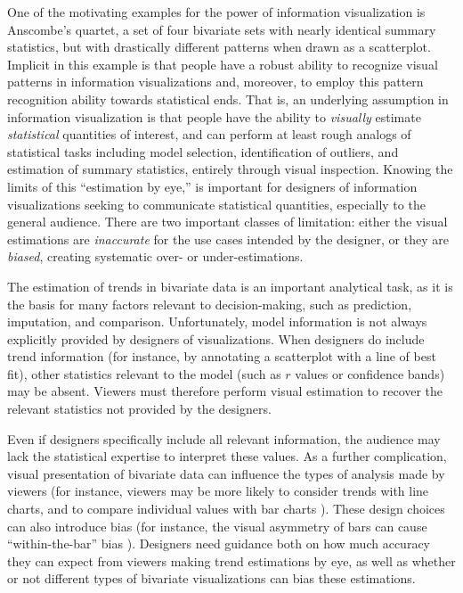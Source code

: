 \documentclass{sigchi}
\begin{document}

One of the motivating examples for the power of information visualization is Anscombe's quartet\cite{anscombe1973graphs}, a set of four bivariate sets with nearly identical summary statistics, but with drastically different patterns when drawn as a scatterplot. Implicit in this example is that people have a robust ability to recognize visual patterns in information visualizations and, moreover, to employ this pattern recognition ability towards statistical ends. That is, an underlying assumption in information visualization is that people have the ability to \emph{visually} estimate \emph{statistical} quantities of interest, and can perform at least rough analogs of statistical tasks including model selection, identification of outliers, and estimation of summary statistics, entirely through visual inspection. Knowing the limits of this ``estimation by eye,'' is important for designers of information visualizations seeking to communicate statistical quantities, especially to the general audience. There are two important classes of limitation: either the visual estimations are \emph{inaccurate} for the use cases intended by the designer, or they are \emph{biased}, creating systematic over- or under-estimations.

The estimation of trends in bivariate data is an important analytical task, as it is the basis for many factors relevant to decision-making, such as prediction, imputation, and comparison. Unfortunately, model information is not always explicitly provided by designers of visualizations. When designers do include trend information (for instance, by annotating a scatterplot with a line of best fit), other statistics relevant to the model (such as $r$ values or confidence bands) may be absent. Viewers must therefore perform visual estimation to recover the relevant statistics not provided by the designers.

Even if designers specifically include all relevant information, the audience may lack the statistical expertise to interpret these values. As a further complication, visual presentation of bivariate data can influence the types of analysis made by viewers (for instance, viewers may be more likely to consider trends with line charts, and to compare individual values with bar charts \cite{zacks1999bars}). These design choices can also introduce bias (for instance, the visual asymmetry of bars can cause ``within-the-bar'' bias \cite{newman2012bar}). Designers need guidance both on how much accuracy they can expect from viewers making trend estimations by eye, as well as whether or not different types of bivariate visualizations can bias these estimations.
\end{document}
